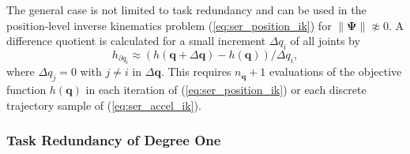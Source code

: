 \documentclass[a4paper,twoside]{article}
\begin{document}
The general case is not limited to task redundancy and can be used in the position-level inverse kinematics problem (\ref{eq:ser_position_ik}) for $\lVert\bm{\Psi}\rVert \not\approx 0$.
A difference quotient is calculated for a small increment $\Delta q_i$ of all joints by
%
\begin{equation}
h_{\partial q_i} \approx (h(\bm{q}+\Delta \bm{q}) - h(\bm{q}))/\Delta q_i,
\label{eq:ser_diffquot_general}
\end{equation}
%
where $\Delta q_j = 0$ with $j \neq i$ in $\Delta \bm{q}$. %
This requires $n_{\bm{q}}{+}1$ evaluations of the objective function $h(\bm{q})$ in each iteration of (\ref{eq:ser_position_ik}) or each discrete trajectory sample of (\ref{eq:ser_accel_ik}).

%
%


\subsubsection{Task Redundancy of Degree One}
\end{document}
